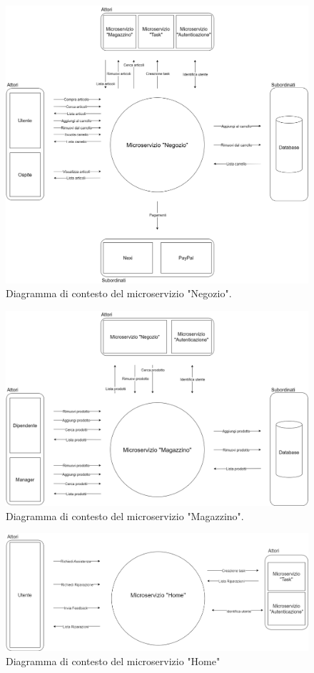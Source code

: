 \documentclass{report}
\begin{document}
\begin{figure}[H]
	\centering\includegraphics[width=1\textwidth]{images/Diagrammi_Contesto/Diagramma_Contesto_Negozio.png}
	Diagramma di contesto del microservizio "Negozio".
\end{figure}

\begin{figure}[H]
	\centering\includegraphics[width=1\textwidth]{images/Diagrammi_Contesto/Diagramma_Contesto_Magazzino.png}
	Diagramma di contesto del microservizio "Magazzino".
\end{figure}
\begin{figure}[H]
	\centering\includegraphics[width=1\textwidth]{images/Diagrammi_Contesto/Diagramma_Contesto_Home.png}
	Diagramma di contesto del microservizio "Home"
\end{figure}
\end{document}
